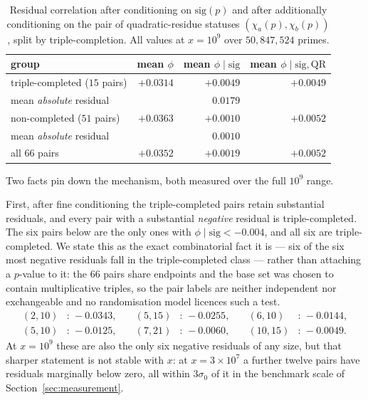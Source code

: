 \documentclass[11pt,reqno]{amsart}
\theoremstyle{plain}
\theoremstyle{definition}
\begin{document}
\begin{table}[t]
\centering
\caption{Residual correlation after conditioning on $\mathrm{sig}(p)$ and
after additionally conditioning on the pair of quadratic-residue statuses
$(\chi_a(p), \chi_b(p))$, split by triple-completion. All values at
$x = 10^9$ over $50{,}847{,}524$ primes.}
\label{tab:residual}
\begin{tabular}{lrrr}
\toprule
group & mean $\phi$ & mean $\phi \mid \mathrm{sig}$
      & mean $\phi \mid \mathrm{sig}, \mathrm{QR}$ \\
\midrule
triple-completed ($15$ pairs)   & $+0.0314$ & $+0.0049$ & $+0.0049$ \\
\quad mean \emph{absolute} residual        &           & $\;\;0.0179$ & \\
non-completed ($51$ pairs) & $+0.0363$ & $+0.0010$ & $+0.0052$ \\
\quad mean \emph{absolute} residual        &           & $\;\;0.0010$ & \\
\midrule
all $66$ pairs                            & $+0.0352$ & $+0.0019$ & $+0.0052$ \\
\bottomrule
\end{tabular}
\end{table}

Two facts pin down the mechanism, both measured over the full $10^9$ range.

First, after fine conditioning the triple-completed pairs retain substantial residuals, and every pair with a substantial \emph{negative} residual is
triple-completed. The six pairs below are the only ones with
$\phi \mid \mathrm{sig} < -0.004$, and all six are triple-completed. We state this as
the exact combinatorial fact it is --- six of the six most negative residuals fall in the triple-completed class --- rather than attaching a $p$-value to it: the
$66$ pairs share endpoints and the base set was chosen to contain
multiplicative triples, so the pair labels are neither independent nor
exchangeable and no randomisation model licences such a test.
\[
  \begin{aligned}
    (2,10)&\!:\, -0.0343, &\quad (5,15)&\!:\, -0.0255, &\quad (6,10)&\!:\, -0.0144, \\
    (5,10)&\!:\, -0.0125, &\quad (7,21)&\!:\, -0.0060, &\quad (10,15)&\!:\, -0.0049 .
  \end{aligned}
\]
At $x = 10^9$ these are also the only six negative residuals of any size, but
that sharper statement is not stable with $x$: at $x = 3 \times 10^7$ a further twelve pairs have residuals marginally below
zero, all within $3\sigma_0$ of it in the benchmark scale of
Section~\ref{sec:measurement}.
\end{document}
